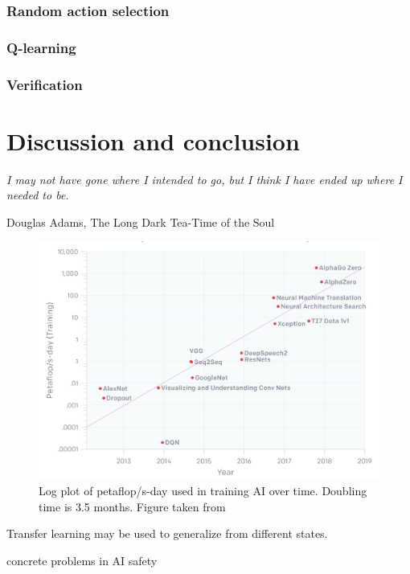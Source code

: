 \documentclass[11pt, a4paper]{report} %
\begin{document}
\subsection{Random action selection}

\subsection{Q-learning}


\subsection{Verification}



\chapter{Discussion and conclusion}\label{chap:conclusion}

\epigraph{\textit{I may not have gone where I intended to go, but I think I have ended up where I needed to be.}}{Douglas Adams, The Long Dark Tea-Time of the Soul}


\begin{figure}[tb!]
  \centering
  \includegraphics[width=\textwidth]{increaseaiflops.png}
  \caption{Log plot of petaflop/s-day used in training AI over time. Doubling time is 3.5 months. Figure taken from~\cite{amodei2018}}
\end{figure}

Transfer learning may be used to generalize from different states.

concrete problems in AI safety\cite{amodei16_concr_probl_ai_safet}
\end{document}
